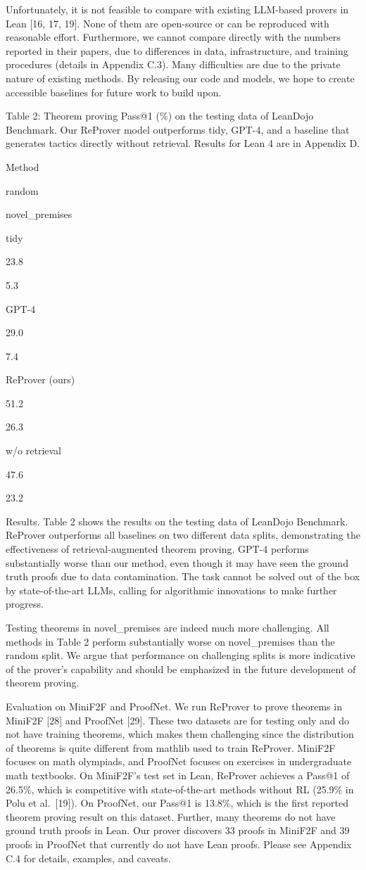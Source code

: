 \documentclass[
]{article}
\begin{document}
Unfortunately, it is not feasible to compare with existing LLM-based
provers in Lean {[}16, 17, 19{]}. None of them are open-source or can be
reproduced with reasonable effort. Furthermore, we cannot compare
directly with the numbers reported in their papers, due to differences
in data, infrastructure, and training procedures (details in Appendix
C.3). Many difficulties are due to the private nature of existing
methods. By releasing our code and models, we hope to create accessible
baselines for future work to build upon.

Table 2: Theorem proving Pass@1 (\%) on the testing data of LeanDojo
Benchmark. Our ReProver model outperforms tidy, GPT-4, and a baseline
that generates tactics directly without retrieval. Results for Lean 4
are in Appendix D.

Method

random

novel\_premises

tidy

23.8

5.3

GPT-4

29.0

7.4

ReProver (ours)

51.2

26.3

w/o retrieval

47.6

23.2

Results. Table 2 shows the results on the testing data of LeanDojo
Benchmark. ReProver outperforms all baselines on two different data
splits, demonstrating the effectiveness of retrieval-augmented theorem
proving. GPT-4 performs substantially worse than our method, even though
it may have seen the ground truth proofs due to data contamination. The
task cannot be solved out of the box by state-of-the-art LLMs, calling
for algorithmic innovations to make further progress.

Testing theorems in novel\_premises are indeed much more challenging.
All methods in Table 2 perform substantially worse on novel\_premises
than the random split. We argue that performance on challenging splits
is more indicative of the prover's capability and should be emphasized
in the future development of theorem proving.

Evaluation on MiniF2F and ProofNet. We run ReProver to prove theorems in
MiniF2F {[}28{]} and ProofNet {[}29{]}. These two datasets are for
testing only and do not have training theorems, which makes them
challenging since the distribution of theorems is quite different from
mathlib used to train ReProver. MiniF2F focuses on math olympiads, and
ProofNet focuses on exercises in undergraduate math textbooks. On
MiniF2F's test set in Lean, ReProver achieves a Pass@1 of 26.5\%, which
is competitive with state-of-the-art methods without RL (25.9\% in Polu
et al.~{[}19{]}). On ProofNet, our Pass@1 is 13.8\%, which is the first
reported theorem proving result on this dataset. Further, many theorems
do not have ground truth proofs in Lean. Our prover discovers 33 proofs
in MiniF2F and 39 proofs in ProofNet that currently do not have Lean
proofs. Please see Appendix C.4 for details, examples, and caveats.
\end{document}
